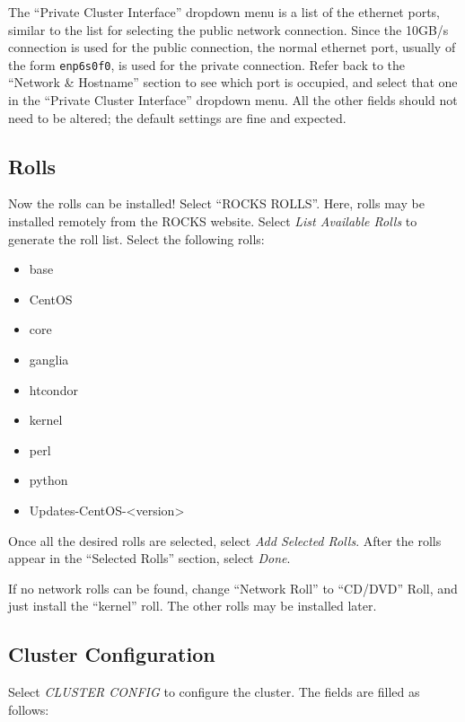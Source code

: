 \documentclass[12pt]{article}
\begin{document}
\qq The ``Private Cluster Interface'' dropdown menu is a list of the ethernet
ports, similar to the list for selecting the public network connection. Since
the 10GB/s connection is used for the public connection, the normal ethernet
port, usually of the form {\tt enp6s0f0}, is used for the private
connection. Refer back to the ``Network \& Hostname'' section to see which port
is occupied, and select that one in the ``Private Cluster Interface'' dropdown
menu. All the other fields should not need to be altered; the default settings
are fine and expected.

\subsection{Rolls}

\qq Now the rolls can be installed! Select ``ROCKS ROLLS''. Here, rolls may be
installed remotely from the ROCKS website. Select \textit{List Available Rolls}
to generate the roll list. Select the following rolls:

\begin{itemize}
  \item base
  \item CentOS
  \item core
  \item ganglia
  \item htcondor
  \item kernel
  \item perl
  \item python
  \item Updates-CentOS-\textless version\textgreater
\end{itemize}

Once all the desired rolls are selected, select \textit{Add Selected
  Rolls}. After the rolls appear in the ``Selected Rolls'' section, select
\textit{Done}.

\qq If no network rolls can be found, change ``Network Roll'' to ``CD/DVD''
Roll, and just install the ``kernel'' roll. The other rolls may be installed later.

\subsection{Cluster Configuration}

\qq Select \textit{CLUSTER CONFIG} to configure the cluster. The fields are
filled as follows:
\end{document}
